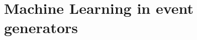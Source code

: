 \documentclass[submission,Phys]{SciPost}
\begin{document}


\section{Machine Learning in event generators}
\label{sec:generators}
\end{document}

